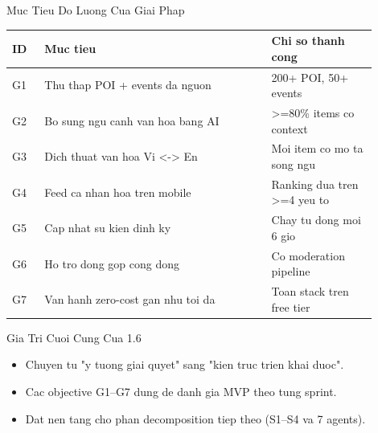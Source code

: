 \begin{frame}[t]{Muc Tieu Do Luong Cua Giai Phap}
\footnotesize
\begin{table}[]
\centering
\begin{tabular}{p{0.08\linewidth} p{0.56\linewidth} p{0.26\linewidth}}
\toprule
\textbf{ID} & \textbf{Muc tieu} & \textbf{Chi so thanh cong} \\
\midrule
G1 & Thu thap POI + events da nguon & 200+ POI, 50+ events \\
G2 & Bo sung ngu canh van hoa bang AI & >=80\% items co context \\
G3 & Dich thuat van hoa Vi <-> En & Moi item co mo ta song ngu \\
G4 & Feed ca nhan hoa tren mobile & Ranking dua tren >=4 yeu to \\
G5 & Cap nhat su kien dinh ky & Chay tu dong moi 6 gio \\
G6 & Ho tro dong gop cong dong & Co moderation pipeline \\
G7 & Van hanh zero-cost gan nhu toi da & Toan stack tren free tier \\
\bottomrule
\end{tabular}
\end{table}
\end{frame}

\begin{frame}[t]{Gia Tri Cuoi Cung Cua 1.6}
\begin{itemize}
    \item Chuyen tu "y tuong giai quyet" sang "kien truc trien khai duoc".
    \item Cac objective G1--G7 dung de danh gia MVP theo tung sprint.
    \item Dat nen tang cho phan decomposition tiep theo (S1--S4 va 7 agents).
\end{itemize}
\end{frame}
